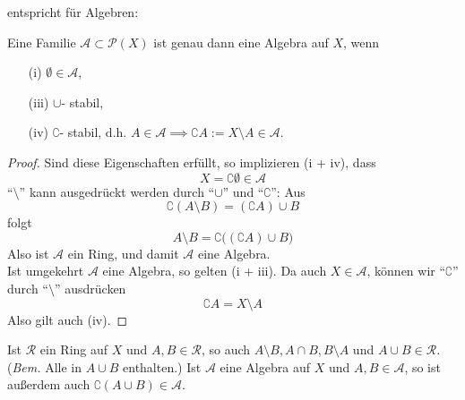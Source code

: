 entspricht für Algebren:
\begin{lemma}
\begin{mdframed}
Eine Familie $\mathcal{A} \subset \mathcal{P}(X)$ ist genau dann eine Algebra auf $X$, wenn
\begin{enumerate}[topsep=3pt, itemsep=0pt]
\item[(i)] $\emptyset \in \mathcal{A}$,
\item[(iii)] $\cup$- stabil,
\item[(iv)] $\complement$- stabil, d.h. $A \in \mathcal{A} \implies \complement A := X\setminus A \in \mathcal{A}$.
\end{enumerate}
\end{mdframed}
\begin{proof}
Sind diese Eigenschaften erfüllt, so implizieren (i + iv), dass
\begin{equation*}
X = \complement \emptyset \in \mathcal{A}
\end{equation*}
``$\setminus$'' kann ausgedrückt werden durch ``$\cup$'' und ``$\complement$'': Aus
\begin{equation*}
\complement (A \setminus B) = (\complement A) \cup B
\end{equation*}
folgt
\begin{equation*}
A \setminus B = \complement \big( (\complement A) \cup B \big)
\end{equation*}
Also ist $\mathcal{A}$ ein Ring, und damit $\mathcal{A}$ eine Algebra. \\
Ist umgekehrt $\mathcal{A}$ eine Algebra, so gelten (i + iii). Da auch $X \in \mathcal{A}$, können wir ``$\complement$'' durch ``$\setminus$'' ausdrücken
\begin{equation*}
\complement A = X \setminus A
\end{equation*}
Also gilt auch (iv).
\end{proof}
\end{lemma}

\begin{folgerung}
Ist $\mathcal{R}$ ein Ring auf $X$ und $A,B \in \mathcal{R}$, so auch $A\setminus B, A\cap B, B\setminus A$ und $A\cup B \in \mathcal{R}$. (\textit{Bem.} Alle in $A\cup B$ enthalten.) Ist $\mathcal{A}$ eine Algebra auf $X$ und $A,B \in \mathcal{A}$, so ist außerdem auch $\complement (A \cup B) \in \mathcal{A}$.
\end{folgerung}

